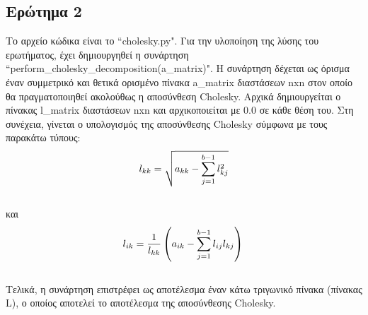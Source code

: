 \documentclass[a4paper,11pt]{article}
\newcommand{\lt}{\latintext}
\begin{document}
\subsection*{Ερώτημα 2}
Το αρχείο κώδικα είναι το {\lt ``cholesky.py"}.
Για την υλοποίηση της λύσης του ερωτήματος, έχει δημιουργηθεί η συνάρτηση {\lt ``perform\_cholesky\_decomposition(a\_matrix)"}. Η συνάρτηση δέχεται ως όρισμα έναν συμμετρικό και θετικά ορισμένο πίνακα {\lt a\_matrix} διαστάσεων {\lt nxn} στον οποίο θα πραγματοποιηθεί ακολούθως η αποσύνθεση {\lt Cholesky}. Αρχικά δημιουργείται ο πίνακας {\lt l\_matrix} διαστάσεων {\lt nxn} και αρχικοποιείται με 0.0 σε κάθε θέση του. Στη συνέχεια, γίνεται ο υπολογισμός της αποσύνθεσης {\lt Cholesky} σύμφωνα με τους παρακάτω τύπους:\\
\begin{equation*}
\\l_{kk} = \sqrt{ a_{kk} - \sum^{b-1}_{j=1} l^2_{kj}}\\
\end{equation*}
\\και\\
\begin{equation*}
\\ l_{ik} = \frac{1}{l_{kk}} \left( a_{ik} - \sum^{b-1}_{j=1} l_{ij} l_{kj} \right)\\
\end{equation*}
\\Τελικά, η συνάρτηση επιστρέφει ως αποτέλεσμα έναν κάτω τριγωνικό πίνακα (πίνακας {\lt L}), ο οποίος αποτελεί το αποτέλεσμα της αποσύνθεσης {\lt Cholesky}.
\end{document}
